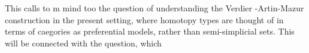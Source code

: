 This calls to m mind too the question of understanding the Verdier
-Artin-Mazur construction in the present setting, where homotopy types
are thought of in terms of caegories as preferential models, rather than
semi-simplicial sets. This will be connected with the question, which
